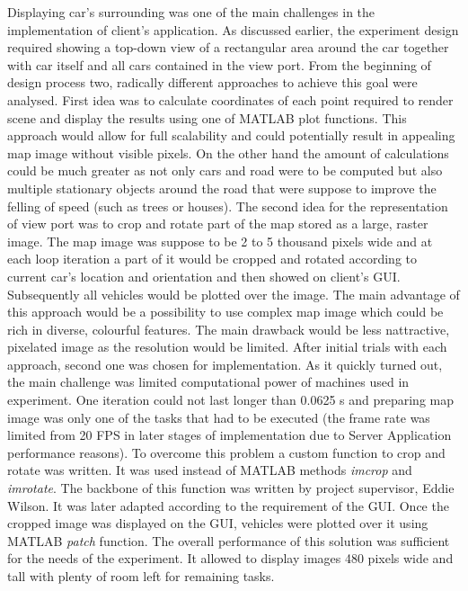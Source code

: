\documentclass[11pt,english]{article}
\begin{document}
Displaying car's surrounding was one of the main challenges in the implementation of client's application. As discussed earlier, the experiment design required showing a top-down view of a rectangular area around the car together with car itself and all cars contained in the view port. From the beginning of design process two, radically different approaches to achieve this goal were analysed. First idea was to calculate coordinates of each point required to render scene and display the results using one of MATLAB plot functions. This approach would allow for full scalability and could potentially result in appealing map image without visible pixels. On the other hand the amount of calculations could be much greater as not only cars and road were to be computed but also multiple stationary objects around the road that were suppose to improve the felling of speed (such as trees or houses). 
The second idea for the representation of view port was to crop and rotate part of the map stored as a large, raster image. The  map image was suppose to be 2 to 5 thousand pixels wide and at each loop iteration a part of it would be cropped and rotated according to current car's location and orientation and then showed on client's GUI. Subsequently all vehicles would be plotted over the image. The main advantage of this approach would be a possibility to use complex map image which could be rich in diverse, colourful features. The main drawback would be less nattractive, pixelated image as the resolution would be limited. 
After initial trials with each approach, second one was chosen for implementation. As it quickly turned out, the main challenge was limited computational power of machines used in experiment. One iteration could not last longer than 0.0625 s and preparing map image was only one of the tasks that had to be executed (the frame rate was limited from 20 FPS in later stages of implementation due to Server Application performance reasons). To overcome this problem a custom function to crop and rotate was written. It was used instead of MATLAB methods \textit{imcrop} and \textit{imrotate}. The backbone of this function was written by project supervisor, Eddie Wilson. It was later adapted according to the requirement of the GUI. 
Once the cropped image was displayed on the GUI, vehicles were plotted over it using MATLAB \textit{patch} function. The overall performance of this solution was sufficient for the needs of the experiment. It allowed to display images 480 pixels wide and tall with plenty of room left for remaining tasks.
\end{document}
